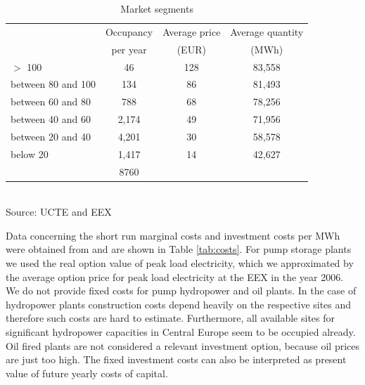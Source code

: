 \begin{table}[htb]
\centering
\caption{Market segments}
\vspace{0.3cm}
\begin{tabular}{lrrr}
\hline
 & \multicolumn{1}{c}{Occupancy} & \multicolumn{1}{c}{Average price} & \multicolumn{1}{c}{Average quantity}   \\ 
 & \multicolumn{1}{c}{per year} & \multicolumn{1}{c}{(EUR)} & \multicolumn{1}{c}{(MWh)}   \\ 
 \hline
$>$ 100 & \multicolumn{1}{c}{46} & \multicolumn{1}{c}{128} & \multicolumn{1}{c}{83,558}   \\ 
between 80 and 100 & \multicolumn{1}{c}{134} & \multicolumn{1}{c}{86} & \multicolumn{1}{c}{81,493}   \\ 
between 60 and 80 & \multicolumn{1}{c}{788} & \multicolumn{1}{c}{68} & \multicolumn{1}{c}{78,256}   \\ 
between 40 and 60 & \multicolumn{1}{c}{2,174} & \multicolumn{1}{c}{49} & \multicolumn{1}{c}{71,956}  \\ 
between 20 and 40 & \multicolumn{1}{c}{4,201} & \multicolumn{1}{c}{30} & \multicolumn{1}{c}{58,578}  \\ 
below 20 & \multicolumn{1}{c}{1,417} & \multicolumn{1}{c}{14} & \multicolumn{1}{c}{42,627} \\
\hline
 & \multicolumn{1}{c}{8760} &  &    \\ 
 \hline
\end{tabular}
\label{tab:demand}
\\
\vspace{0.3cm}
\scriptsize Source: UCTE and EEX 
\end{table}


Data concerning the short run marginal costs and investment costs per MWh were obtained from \cite{Auer2006} and are shown in Table \ref{tab:costs}. For pump storage plants we used the real option value of peak load electricity, which we approximated by the average option price for peak load electricity at the EEX in the year 2006. We do not provide fixed costs for pump hydropower and oil plants. In the case of hydropower plants construction costs depend heavily on the respective sites and therefore such costs are hard to estimate. Furthermore, all available sites for significant hydropower capacities in Central Europe seem to be occupied already. Oil fired plants are not considered a relevant investment option, because oil prices are just too high. The fixed investment costs can also be interpreted as present value of future yearly costs of capital.

